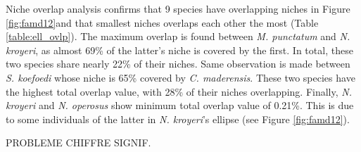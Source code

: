 Niche overlap analysis confirms that 9 species have overlapping niches in Figure \ref{fig:famd12}and that smallest niches overlaps each other the most (Table \ref{table:ell_ovlp}). The maximum  overlap is found between \textit{M. punctatum} and \textit{N. kroyeri}, as almost 69\% of the latter's niche is covered by the first. In total, these two species share nearly 22\% of their niches. Same observation is made between \textit{S. koefoedi} whose niche is 65\% covered by \textit{C. maderensis}. These two species have the highest total overlap value, with 28\% of their niches overlapping. Finally, \textit{N. kroyeri} and \textit{N. operosus} show minimum total overlap value of 0.21\%. This is due to some individuals of the latter in \textit{N. kroyeri}'s ellipse (see Figure \ref{fig:famd12}). 

PROBLEME CHIFFRE SIGNIF.


